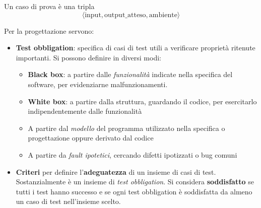 \begin{definition}
	Un caso di prova è una tripla
	\begin{equation*}
		\langle \text{input}, \text{output\_atteso}, \text{ambiente}\rangle
	\end{equation*}
\end{definition}
\noindent Per la progettazione servono:
\begin{itemize}
	\item \textbf{Test obbligation}: specifica di casi di test utili a verificare proprietà ritenute importanti. Si possono definire in diversi modi:
	\begin{itemize}
		\item \textbf{Black box}: a partire dalle \textit{funzionalità} indicate nella specifica del software, per evidenziarne malfunzionamenti.
		\item \textbf{White box}: a partire dalla struttura, guardando il codice, per esercitarlo indipendentemente dalle funzionalità
		\item A partire dal \textit{modello} del programma utilizzato nella specifica o progettazione oppure derivato dal codice
		\item A partire da \textit{fault ipotetici}, cercando difetti ipotizzati o bug comuni
	\end{itemize}
	\item \textbf{Criteri} per definire l'\textbf{adeguatezza} di un insieme di casi di test. Sostanzialmente è un insieme di \textit{test obbligation}. Si considera \textbf{soddisfatto} se tutti i test hanno successo e se ogni test obbligation è soddisfatta da almeno un caso di test nell'insieme scelto.
\end{itemize}

